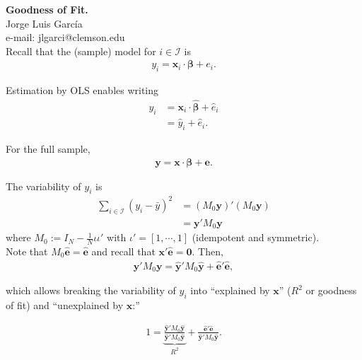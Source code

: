 
\let\counterwithout\relax
\let\counterwithin\relax
{}



\noindent \textbf{Goodness of Fit.}\\
\noindent Jorge Luis García \\
\noindent e-mail: jlgarci@clemson.edu\\

\noindent Recall that the (sample) model for $i \in \mathcal{I}$ is
\begin{align}
y_i = \bm{x}_i \cdot \bm{\beta} + e_i. \label{eq:model}
\end{align}

\noindent Estimation by OLS enables writing 
\begin{align}
y_i & = \bm{x}_i \cdot \hat{\bm{\beta}} + \hat{e}_i \nonumber \\ 
    & = \hat{y}_i + \hat{e}_i. \label{eq:modele}
\end{align}

\noindent For the full sample,
\begin{align}
\bm{y} = \bm{x} \cdot \bm{\beta} + \bm{e}.
\end{align}

\noindent The variability of $y_{i}$ is 
\begin{align}
	\sum \limits _{i \in \mathcal{I} } {\left( y_i - \bar{y} \right)}^2 & = \left( M_0 \bm{y} \right)'  \left( M_0 \bm{y} \right) \nonumber \\ 
	    & = \bm{y}' M_0 \bm{y}
\end{align}
\noindent where $M_0:= I_N - \frac{1}{N} \iota \iota'$ with $\iota' = \left[ 1, \cdots, 1 \right]$ (idempotent and symmetric).\\ 

\noindent Note that $M_0 \bm{\hat{e}} = \bm{\hat{e}}$ and recall that $\bm{x}'\bm{\hat{e}} = \bm{0}$. Then, 
\begin{align}
 	\bm{y}' M_0 \bm{y} = \bm{\hat{y}}' M_0 \bm{\hat{y}} + \bm{\hat{e}}' \bm{\hat{e}}, 
\end{align}

\noindent which allows breaking the variability of $y_{i}$ into ``explained by $\bm{x}$'' ($R^2$ or goodness of fit) and ``unexplained by $\bm{x}$:''

\begin{align}
	1 = \underbrace{ \frac{ \bm{\hat{y}}' M_0 \bm{\hat{y}} }{ \bm{\hat{y}}' M_0 \bm{\hat{y}} } }_{R^2} + \frac{\bm{\hat{e}}' \bm{\hat{e}}}{ \bm{\hat{y}}' M_0 \bm{\hat{y}} }. 
\end{align}

